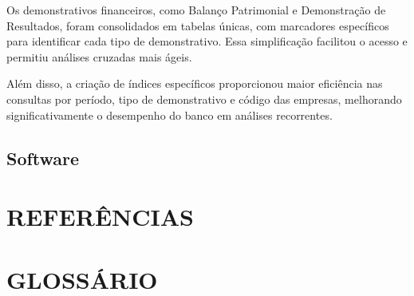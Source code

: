 \documentclass[recuosum=1.5cm]{iftex2024}
\begin{document}
Os demonstrativos financeiros, como Balanço Patrimonial e Demonstração de Resultados, foram consolidados em tabelas únicas, com marcadores específicos para identificar cada tipo de demonstrativo. Essa simplificação facilitou o acesso e permitiu análises cruzadas mais ágeis.

Além disso, a criação de índices específicos proporcionou maior eficiência nas consultas por período, tipo de demonstrativo e código das empresas, melhorando significativamente o desempenho do banco em análises recorrentes.

\section{Software} \label{sec:software}
















\chapter*{REFERÊNCIAS}

\printbibliography

\chapter*{GLOSSÁRIO}
\end{document}
